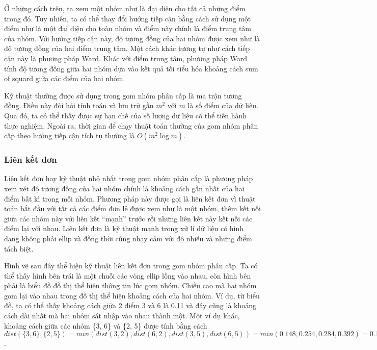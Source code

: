 Ở những cách trên, ta xem một nhóm như là đại diện cho tất cả những điểm trong đó.
Tuy nhiên, ta có thể thay đổi hướng tiếp cận bằng cách sử dụng một điểm như là một đại diện cho toàn nhóm và điểm này chính là điểm trung tâm của nhóm.
Với hướng tiếp cận này, độ tương đồng của hai nhóm được xem như là độ tương đồng của hai điểm trung tâm.
Một cách khác tương tự như cách tiếp cận này là phương pháp Ward.
Khác với điểm trung tâm, phương pháp Ward tính độ tương đồng giữa hai nhóm dựa vào kết quả tối tiểu hóa khoảng cách sum of squard giữa các điểm của hai nhóm.

Kỹ thuật thường được sử dụng trong gom nhóm phân cấp là ma trận tương đồng.
Điều này đòi hỏi tính toán và lưu trữ gần $m^2$ với $m$ là số điểm của dữ liệu.
Qua đó, ta có thể thấy được sự hạn chế của số lượng dữ liệu có thể tiến hành thực nghiệm.
Ngoài ra, thời gian để chạy thuật toán thường của gom nhóm phân cấp theo hướng tiếp cận tích tụ thường là $O(m^2 \log{m}).$

\subsubsection{Liên kết đơn}		
Liên kết đơn hay kỹ thuật nhỏ nhất trong gom nhóm phân cấp là phương pháp xem xét độ tương đồng của hai nhóm chính là khoảng cách gần nhất của hai điểm bất kì trong mỗi nhóm. 
Phương pháp này được gọi là liên kết đơn vì thuật toán bắt đầu với tất cả các điểm đơn lẻ được xem như là một nhóm, thêm kết nối giữa các nhóm này với liên kết ``mạnh'' trước rồi những liên kết này kết nối các điểm lại với nhau.
Liên kết đơn là kỹ thuật mạnh trong xử lí dữ liệu có hình dạng không phải ellip và đồng thời cũng nhạy cảm với độ nhiễu và những điểm tách biệt.

Hình vẽ sau đây thể hiện kỹ thuật liên kết đơn trong gom nhóm phân cấp.
Ta có thể thấy hình bên trái là một chuỗi các vòng ellip lồng vào nhau, còn hình bên phải là biểu đồ đồ thị thể hiện thông tin lúc gom nhóm.
Chiều cao mà hai nhóm gom lại vào nhau trong đồ thị thể hiện khoảng cách của hai nhóm.
Ví dụ, từ biểu đồ, ta có thể thấy khoảng cách giữa 2 điểm 3 và 6 là 0.11 và đây cũng là khoảng cách dài nhất mà hai nhóm sát nhập vào nhau thành một. 
Một ví dụ khác, khoảng cách giữa các nhóm \{3, 6\} và \{2, 5\} được tính  bằng cách $dist(\{3, 6\}, \{2, 5\}) = min(dist(3,2),dist(6, 2), dist(3, 5), dist(6, 5)) = min (0.148, 0.254, 0.284, 0.392) = 0.148$.


